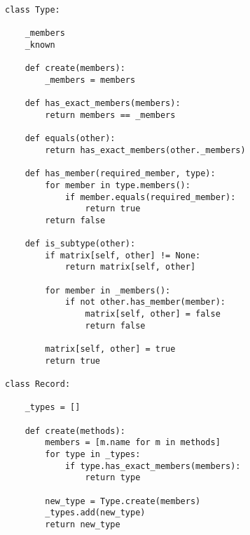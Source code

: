 \begin{lstlisting}[label={code:typecheck},caption={An overview of our implementation of types and the global record.}]
class Type:

    _members
    _known
    
    def create(members):
        _members = members

    def has_exact_members(members):
        return members == _members

    def equals(other):
        return has_exact_members(other._members)

    def has_member(required_member, type):
        for member in type.members():
            if member.equals(required_member):
                return true
        return false

    def is_subtype(other):
        if matrix[self, other] != None:
            return matrix[self, other]

        for member in _members():
            if not other.has_member(member):
                matrix[self, other] = false
                return false

        matrix[self, other] = true
        return true

class Record:    
    
    _types = []

    def create(methods):
        members = [m.name for m in methods]
        for type in _types:
            if type.has_exact_members(members):
                return type

        new_type = Type.create(members)
        _types.add(new_type)
        return new_type
\end{lstlisting}